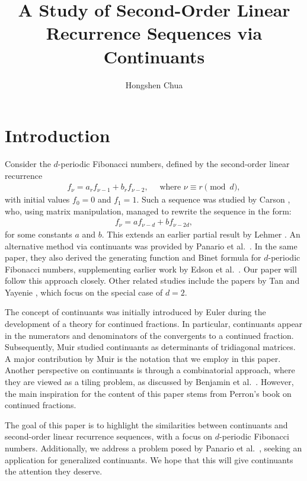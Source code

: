 \documentclass[12pt]{article}
\title{A Study of Second-Order Linear Recurrence Sequences via Continuants}
\author{Hongshen Chua}
\date{}
\theoremstyle{plain}
\theoremstyle{definition}
\theoremstyle{remark}
\begin{document}
\maketitle

\section{Introduction} \label{Sec:Introduction}

Consider the $ d $-periodic Fibonacci numbers, defined by the second-order linear recurrence
\begin{align*}
	f_\nu = a_r f_{\nu - 1} + b_r f_{\nu - 2}, \quad \text{ where } \nu \equiv r \pmod{d},
\end{align*}
with initial values $ f_0 = 0 $ and $ f_1 = 1 $. Such a sequence was studied by Carson \cite{Carson_07}, who, using matrix manipulation, managed to rewrite the sequence in the form:
\begin{align*}
	f_\nu = af_{\nu - d} + bf_{\nu - 2d},
\end{align*}
for some constants $ a $ and $ b $. This extends an earlier partial result by Lehmer \cite{Lehmer_75}. An alternative method via continuants was provided by Panario et al.\ \cite{Panario_Sahin_Wang_13}. In the same paper, they also derived the generating function and Binet formula for $ d $-periodic Fibonacci numbers, supplementing earlier work by Edson et al.\ \cite{Edson_Lewis_Yayenie_11}. Our paper will follow this approach closely. Other related studies include the papers by Tan \cite{Tan_11} and Yayenie \cite{Yayenie_11}, which focus on	the special case of $ d = 2 $. 

The concept of continuants was initially introduced by Euler during the development of a theory for continued fractions. In particular, continuants appear in the numerators and denominators of the convergents to a continued fraction. Subsequently, Muir \cite{Muir_60} studied continuants as determinants of tridiagonal matrices. A major contribution by Muir is the notation that we employ in this paper. Another perspective on continuants is through a combinatorial approach, where they are viewed as a tiling problem, as discussed by Benjamin et al.\ \cite{Benjamin_Su_Quinn_00}. However, the main inspiration for the content of this paper stems from Perron's book \cite{Perron_13} on continued fractions. 	

The goal of this paper is to highlight the similarities between continuants and second-order linear recurrence sequences, with a focus on $ d $-periodic Fibonacci numbers. Additionally, we address a problem posed by Panario et al.\ \cite{Panario_Sahin_Wang_13}, seeking an application for generalized continuants. We hope that this will give continuants the attention they deserve.
\end{document}
